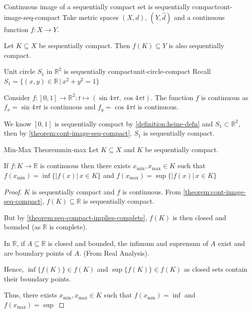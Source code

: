 \documentclass{article}
\numberwithin{equation}{section}
\numberwithin{figure}{section}
\begin{document}
\begin{theorem}{Continuous image of a sequentially compact set is sequentially compact}{cont-image-seq-compact}
    Take metric spaces $(X,d)$, $(Y, \hat{d})$ and a continuous function $f: X \to Y$.

    Let $K \subseteq X$ be sequentially compact. Then $f(K) \subseteq Y$ is also sequentially compact. 
\end{theorem}
\begin{example}{Unit circle \texorpdfstring{$S_1$}{} in \texorpdfstring{$\mathbb{R}^2$}{two-dimensional Euclidean space} is sequentially compact}{unit-circle-compact}
    Recall $S_1 = \{(x,y)\in \mathbb{R} \,\vert\, x^2+y^2=1\}$

    Consider $f:[0,1]\to \mathbb{R}^2 : t \mapsto (\sin{4\pi t}, \cos{4\pi t})$. The function $f$ is continuous as $f_x=\sin{4\pi t}$ is continuous and $f_y=\cos{4\pi t}$ is continuous.

    We know $[0,1]$ is sequentially compact by \cref{definition:heine-defn} and $S_1 \subset \mathbb{R}^2$, then by \cref{theorem:cont-image-seq-compact}, $S_1$ is sequentially compact.
\end{example}
\begin{theorem}{Min-Max Theorem}{min-max}
    Let $K \subseteq X$ and $K$ be sequentially compact.

    If $f: K \to \mathbb{R}$ is continuous then there exists $x_{\min},x_{\max}\in K$ such that $f(x_{\min})=\inf\{|f(x)| \, x \in K\}$ and $f(x_{\max})=\sup\{|f(x)| \, x \in K\}$

    \begin{proof}
        $K$ is sequentially compact and $f$ is continuous. From \cref{theorem:cont-image-seq-compact}, $f(K)\subseteq \mathbb{R}$ is sequentially compact.

        But by \cref{theorem:seq-compact-implies-complete},  $f(K)$ is then closed and bounded (as $\mathbb{R}$ is complete).

        In $\mathbb{R}$, if $A \subseteq \mathbb{R}$ is closed and bounded, the infimum and supremum of $A$ exist and are boundary points of $A$. (From Real Analysis).

        Hence, $\inf\{f(K)\} \in f(K)$ and $\sup\{f(K)\} \in f(K)$ as closed sets contain their boundary points.

        Thus, there exists $x_{\min},x_{\max} \in K$
        such that $f(x_{\min})=\inf$ and $f(x_{\max})=\sup$
\end{proof}
\end{theorem}
\pagebreak
\end{document}
